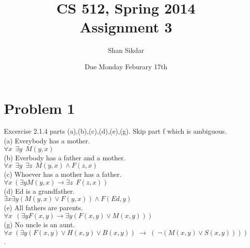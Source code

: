 \documentclass[11pt,leqno,fleqn]{article}
\title{CS 512, Spring 2014
       \\[1ex]
       \textbf{Assignment 3}}
\author{Shan Sikdar}
\date{Due Monday Feburary 17th} %
\begin{document}
\maketitle

\section{Problem 1 }
Excercise 2.1.4 parts (a),(b),(c),(d),(e),(g). Skip part f which is ambiguous.\\
(a) Everybody has a mother.\\
$\forall x \ \ \exists y \ \ M(y,x)$\\
(b) Everbody has a father and a mother.\\
$\forall x \ \ \exists y  \ \ \exists z  \ \ M(y,x) \land F(z,x)$\\
(c) Whoever has a mother has a father.\\
$\forall x \ ( \exists y M(y,x) \to \exists z \ \   F(z,x))$\\
(d) Ed is a grandfather.\\
$ \exists x \exists y (M(y,x) \lor F(y,x)) \land F(Ed,y)$\\
(e) All fathers are parents.\\
$\forall x \ \ (\exists y F(x,y) \to \exists y ( F(x,y) \lor M(x,y)))  $\\
(g) No uncle is an aunt.\\
$\forall x \; ( \exists y (F(x,y) \vee H(x,y) \vee B(x,y)) \; \rightarrow \; ( \; \neg(M(x,y) \vee S(x,y))))$.

\newpage
\end{document}
